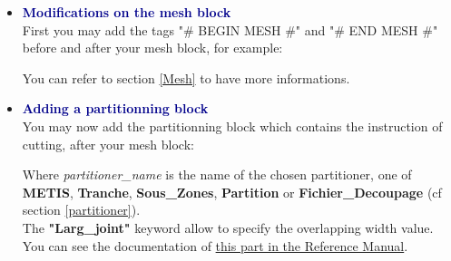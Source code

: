 \begin{itemize}
\item \textbf{\textcolor{darkblue}{Modifications on the mesh block}}\\
First you may add the tags "\# BEGIN MESH \#" and "\# END MESH \#" before and after your mesh block, for example:
\begin{center}
\end{center}
You can refer to section \ref{Mesh} to have more informations.




\item \textbf{\textcolor{darkblue}{Adding a partitionning block}}\\
You may now add the partitionning block which contains the instruction of cutting, after your mesh block:
\begin{center}
\end{center}
Where \textit{partitioner\_name} is the name of the chosen partitioner, one of \textbf{METIS}, \textbf{Tranche}, \textbf{Sous\_Zones}, \textbf{Partition} or \textbf{Fichier\_Decoupage} (cf section \ref{partitioner}).\\
The \textbf{"Larg\_joint"} keyword allow to specify the overlapping width value.
You can see the documentation of \href{\REFERENCEMANUAL\#partition}{this part in the \trustref Reference Manual}.\\


\end{itemize}
